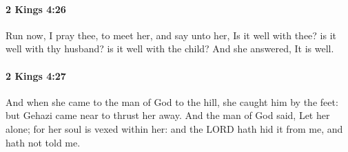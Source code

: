 		\paragraph{2 Kings 4:26} %
			\label{2KINGS-4-26}

			Run now, I pray thee, to meet her, and say unto her, Is it well with thee? is it well with thy husband? is it well with the child? And she answered, It is well.


		\paragraph{2 Kings 4:27} %
			\label{2KINGS-4-27}

			And when she came to the man of God to the hill, she caught him by the feet: but Gehazi came near to thrust her away. And the man of God said, Let her alone; for her soul is vexed within her: and the LORD hath hid it from me, and hath not told me.

